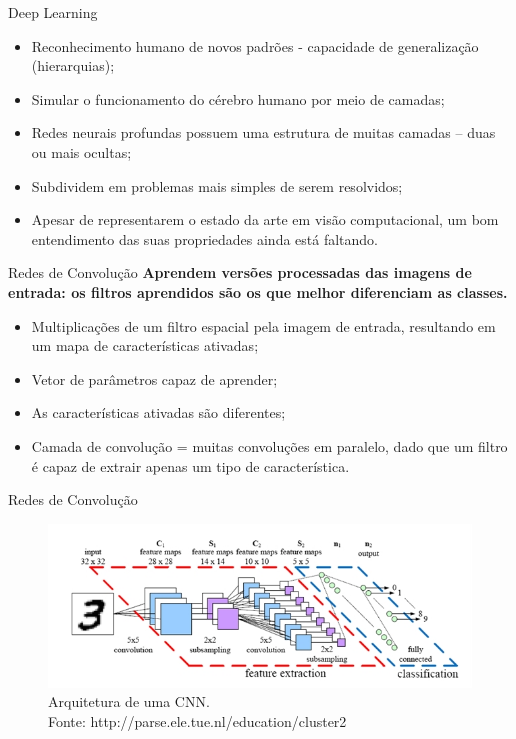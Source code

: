 \documentclass{beamer}
\begin{document}
\begin{frame}{Deep Learning}
\setlength\leftmargini{0em}
\justifying
\begin{itemize}
  \item Reconhecimento humano de novos padrões - capacidade de generalização (hierarquias);%
  \item Simular o funcionamento do cérebro humano por meio de camadas;
  \item Redes neurais profundas possuem uma estrutura de muitas camadas -- duas ou mais ocultas; %
  \item Subdividem em problemas mais simples de serem resolvidos;
  \item Apesar de representarem o estado da arte em visão computacional, um bom entendimento das suas propriedades ainda está faltando.
\end{itemize}
\end{frame}
\begin{frame}{Redes de Convolução}
\setlength\leftmargini{0em}
\justifying
\textbf{Aprendem versões processadas das imagens de entrada: os filtros aprendidos são os que melhor diferenciam as classes.}
\begin{itemize}
  \item Multiplicações de um filtro espacial pela imagem de entrada, resultando em um mapa de características ativadas; 
  \item Vetor de parâmetros capaz de aprender;
  \item As características ativadas são diferentes;
  \item Camada de convolução = muitas convoluções em paralelo, dado que um filtro é capaz de extrair apenas um tipo de característica.
\end{itemize}
\end{frame}
\begin{frame}{Redes de Convolução}
 \begin{figure}[hbpt]
 \begin{center}
   \includegraphics[width=1\linewidth]{figuras/CNNArchitecture.jpg}
 \end{center}
  \caption{Arquitetura de uma CNN. \\ Fonte: http://parse.ele.tue.nl/education/cluster2}
\end{figure}
\end{frame}
\end{document}
